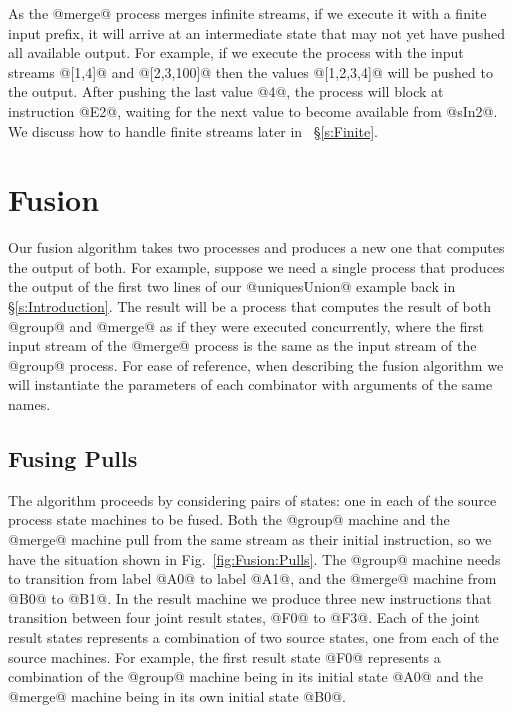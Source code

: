 As the @merge@ process merges infinite streams, if we execute it with a finite input prefix, it will arrive at an intermediate state that may not yet have pushed all available output. For example, if we execute the process with the input streams @[1,4]@ and @[2,3,100]@ then the values @[1,2,3,4]@ will be pushed to the output. After pushing the last value @4@, the process will block at instruction @E2@, waiting for the next value to become available from @sIn2@. We discuss how to handle finite streams later in ~\S\ref{s:Finite}.


\section{Fusion}

Our fusion algorithm takes two processes and produces a new one that computes the output of both. For example, suppose we need a single process that produces the output of the first two lines of our @uniquesUnion@ example back in \S\ref{s:Introduction}. The result will be a process that computes the result of both @group@ and @merge@ as if they were executed concurrently, where the first input stream of the @merge@ process is the same as the input stream of the @group@ process. For ease of reference, when describing the fusion algorithm we will instantiate the parameters of each combinator with arguments of the same names.


\subsection{Fusing Pulls}
\label{s:Fusion:FusingPulls}

The algorithm proceeds by considering pairs of states: one in each of the source process state machines to be fused. Both the @group@ machine and the @merge@ machine pull from the same stream as their initial instruction, so we have the situation shown in Fig.~\ref{fig:Fusion:Pulls}. The @group@ machine needs to transition from label @A0@ to label @A1@, and the @merge@ machine from @B0@ to @B1@. In the result machine we produce three new instructions that transition between four joint result states, @F0@ to @F3@.
Each of the joint result states represents a combination of two source states, one from each of the source machines. For example, the first result state @F0@ represents a combination of the @group@ machine being in its initial state @A0@ and the @merge@ machine being in its own initial state @B0@. 

